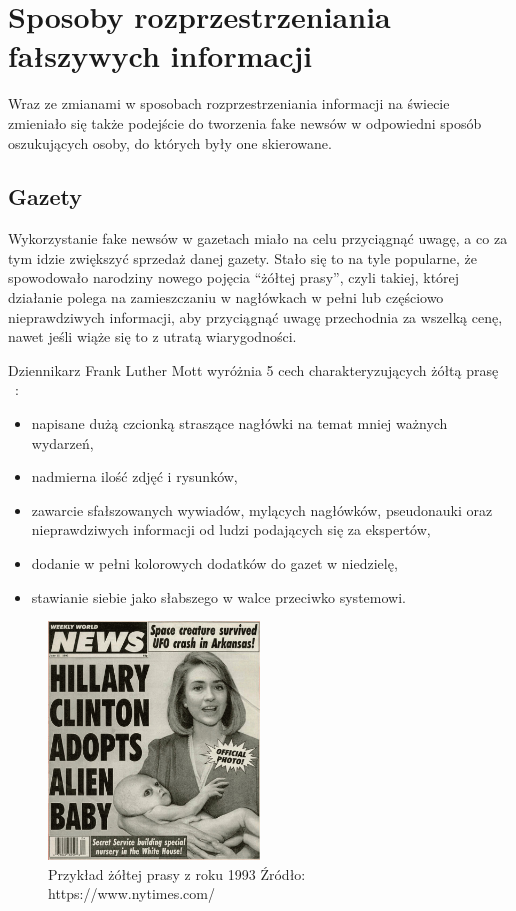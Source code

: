 \section{Sposoby rozprzestrzeniania fałszywych informacji}
Wraz ze zmianami w sposobach rozprzestrzeniania informacji na świecie zmieniało się
także podejście do tworzenia fake newsów w odpowiedni sposób oszukujących osoby, do których 
były one skierowane. 

\subsection{Gazety}
Wykorzystanie fake newsów w gazetach miało na celu przyciągnąć uwagę, a co za 
tym idzie zwiększyć sprzedaż danej gazety. Stało się to na tyle popularne, że spowodowało
narodziny nowego pojęcia ``żółtej prasy'', czyli takiej, której działanie polega na zamieszczaniu 
w nagłówkach w pełni lub częściowo nieprawdziwych informacji, aby przyciągnąć uwagę przechodnia 
za wszelką cenę, nawet jeśli wiąże się to z utratą wiarygodności. 

Dziennikarz Frank Luther Mott wyróżnia 5 cech charakteryzujących 
żółtą prasę ~\cite{YellowPressFrank}:
\begin{itemize}
    \item napisane dużą czcionką straszące nagłówki na temat mniej ważnych wydarzeń,
    \item nadmierna ilość zdjęć i rysunków,
    \item zawarcie sfałszowanych wywiadów, mylących nagłówków, pseudonauki oraz nieprawdziwych informacji od ludzi podających się za ekspertów,
    \item dodanie w pełni kolorowych dodatków do gazet w niedzielę,
    \item stawianie siebie jako słabszego w walce przeciwko systemowi.
\end{itemize}

\begin{figure}[h!]
    \centering
    \includegraphics[width=0.5\textwidth]{./Img/fake-newspaper.jpg}
    \caption{Przykład żółtej prasy z roku 1993 Źródło: https://www.nytimes.com/}
\end{figure}


